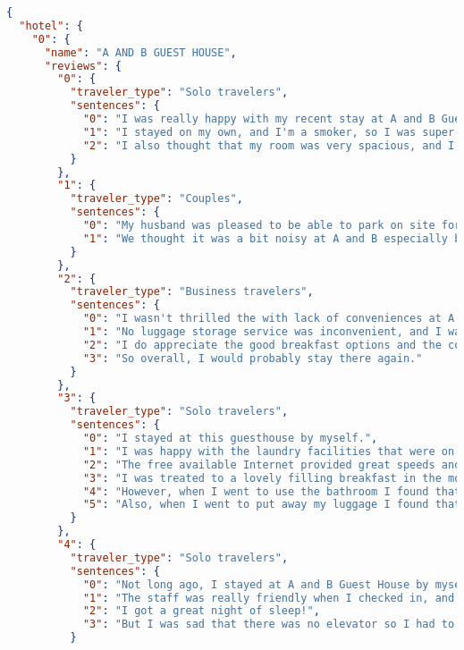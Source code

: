 \begin{lstlisting}[language=json,basicstyle=\scriptsize,columns=flexible]
{
  "hotel": {
    "0": {
      "name": "A AND B GUEST HOUSE",
      "reviews": {
        "0": {
          "traveler_type": "Solo travelers",
          "sentences": {
            "0": "I was really happy with my recent stay at A and B Guest House.",
            "1": "I stayed on my own, and I'm a smoker, so I was super happy that there was a designated area especially for smokers.",
            "2": "I also thought that my room was very spacious, and I was pleased with the breakfast options that were available."
          }
        },
        "1": {
          "traveler_type": "Couples",
          "sentences": {
            "0": "My husband was pleased to be able to park on site for free.",
            "1": "We thought it was a bit noisy at A and B especially because it was just us and we had looked forward to quiet."
          }
        },
        "2": {
          "traveler_type": "Business travelers",
          "sentences": {
            "0": "I wasn't thrilled the with lack of conveniences at A and B Guest House on my recent business trip.",
            "1": "No luggage storage service was inconvenient, and I was surprised there was no safety deposit box in a room.",
            "2": "I do appreciate the good breakfast options and the comfort of the bed, though.",
            "3": "So overall, I would probably stay there again."
          }
        },
        "3": {
          "traveler_type": "Solo travelers",
          "sentences": {
            "0": "I stayed at this guesthouse by myself.",
            "1": "I was happy with the laundry facilities that were on site.",
            "2": "The free available Internet provided great speeds and a strong connection.",
            "3": "I was treated to a lovely filling breakfast in the morning.",
            "4": "However, when I went to use the bathroom I found that the bathroom was not clean.",
            "5": "Also, when I went to put away my luggage I found that there were no provided spaces in which to do so."
          }
        },
        "4": {
          "traveler_type": "Solo travelers",
          "sentences": {
            "0": "Not long ago, I stayed at A and B Guest House by myself.",
            "1": "The staff was really friendly when I checked in, and I was thrilled with how comfy the bed was.",
            "2": "I got a great night of sleep!",
            "3": "But I was sad that there was no elevator so I had to use the stairs, and overall I think the room was overpriced."
          }

\end{lstlisting}
